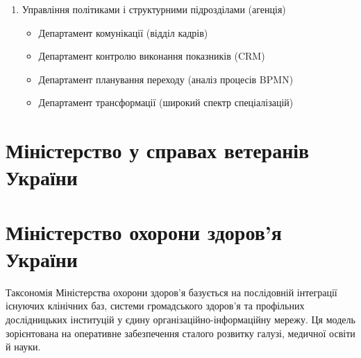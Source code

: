 \begin{enumerate}
\begin{itemize}
\begin{itemize}
            \item Національна академія мистецтв
            \item Національна кінематика
        \end{itemize}
        \item Інститут фізики і матеріалознавства
        \item Інститут геології і геохімії
        \item Інститут хімії і біології
        \item Інститут соціальних і гуманітарних наук
        \begin{itemize}
            \item Ректорат філософії
            \item Ректорат археології
            \item Ректорат національної історії
            \item Ректорат права
            \item Національна бібліотека
        \end{itemize}
    \end{itemize}
    \item Управління політиками і структурними підрозділами (агенція)
    \begin{itemize}
        \item Департамент комунікації (відділ кадрів)
        \item Департамент контролю виконання показників (CRM)
        \item Департамент планування переходу (аналіз процесів BPMN)
        \item Департамент трансформації (широкий спектр спеціалізацій)
    \end{itemize}
\end{enumerate}

\newpage
\section{Міністерство у справах ветеранів України}
\section{Міністерство охорони здоров'я України}

Таксономія Міністерства охорони здоров'я базується на послідовній інтеграції існуючих клінічних баз, системи громадського здоров'я та профільних дослідницьких інституцій у єдину організаційно-інформаційну мережу. Ця модель зорієнтована на оперативне забезпечення сталого розвитку галузі, медичної освіти й науки.

